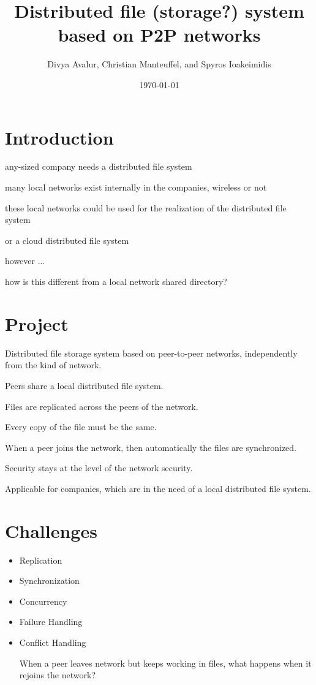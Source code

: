 \documentclass[a4paper, 11pt]{scrartcl}                %
\title{\Large Distributed file (storage?) system based on P2P networks}
\author{\small Divya Avalur, Christian Manteuffel, and Spyros Ioakeimidis}
\date{\small \today}
\begin{document}
\maketitle

\section{Introduction}

any-sized company needs a distributed file system

many local networks exist internally in the companies, wireless or not

these local networks could be used for the realization of the distributed file system

or a cloud distributed file system

however ...

how is this different from a local network shared directory?

\section{Project}

Distributed file storage system based on peer-to-peer networks, independently from the kind of network.

Peers share a local distributed file system.

Files are replicated across the peers of the network.

Every copy of the file must be the same.

When a peer joins the network, then automatically the files are synchronized.

Security stays at the level of the network security.

Applicable for companies, which are in the need of a local distributed file system.

\section{Challenges}

\begin{itemize}
	\item Replication
	\item Synchronization
	\item Concurrency
	\item Failure Handling
	\item Conflict Handling
	
	When a peer leaves network but keeps working in files, what happens when it rejoins the network?
\end{itemize}
\end{document}
